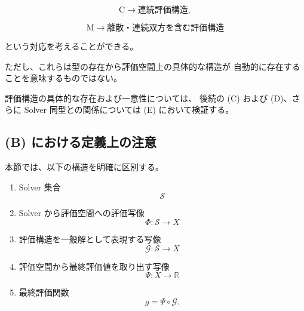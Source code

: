 \documentclass[a4paper,11pt]{article}
\newcommand{\Solver}{\mathcal{S}}
\newcommand{\CType}{\mathrm{C}}
\newcommand{\MType}{\mathrm{M}}
\newcommand{\R}{\mathbb{R}}
\begin{document}
\begin{equation}
    \CType
    \longrightarrow
    \text{連続評価構造},
\end{equation}

\begin{equation}
    \MType
    \longrightarrow
    \text{離散・連続双方を含む評価構造}
\end{equation}

という対応を考えることができる。

ただし、これらは型の存在から評価空間上の具体的な構造が
自動的に存在することを意味するものではない。

評価構造の具体的な存在および一意性については、
後続の (C) および (D)、さらに Solver 同型との関係については
(E) において検証する。


\subsection*{(B) における定義上の注意}

本節では、以下の構造を明確に区別する。

\begin{enumerate}
    \item Solver 集合
    \begin{equation}
        \Solver
    \end{equation}

    \item Solver から評価空間への評価写像
    \begin{equation}
        \Phi:\Solver\to X
    \end{equation}

    \item 評価構造を一般解として表現する写像
    \begin{equation}
        \mathcal{G}:\Solver\to X
    \end{equation}

    \item 評価空間から最終評価値を取り出す写像
    \begin{equation}
        \Psi:X\to\R
    \end{equation}

    \item 最終評価関数
    \begin{equation}
        g=\Psi\circ\mathcal{G}.
    \end{equation}
\end{enumerate}
\end{document}
